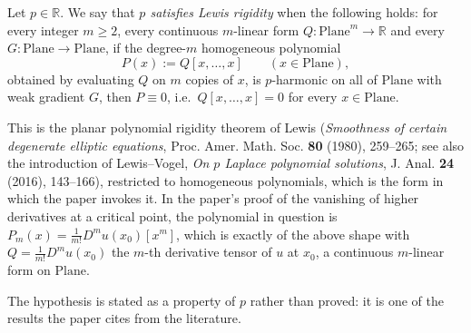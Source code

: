 \begin{definition}
Let $p\in\mathbb{R}$.  We say that \emph{$p$ satisfies Lewis rigidity} when the following
holds: for every integer $m\ge2$, every continuous $m$-linear form
$Q\colon\mathrm{Plane}^m\to\mathbb{R}$ and every $G\colon\mathrm{Plane}\to\mathrm{Plane}$, if
the degree-$m$ homogeneous polynomial
\[
  P(x):=Q[x,\ldots,x]\qquad(x\in\mathrm{Plane}),
\]
obtained by evaluating $Q$ on $m$ copies of $x$, is $p$-harmonic on all of $\mathrm{Plane}$
with weak gradient $G$, then $P\equiv0$, i.e.\ $Q[x,\ldots,x]=0$ for every
$x\in\mathrm{Plane}$.

This is the planar polynomial rigidity theorem of Lewis (\emph{Smoothness of certain
degenerate elliptic equations}, Proc. Amer. Math. Soc. \textbf{80} (1980), 259--265; see also
the introduction of Lewis--Vogel, \emph{On $p$ Laplace polynomial solutions}, J. Anal.
\textbf{24} (2016), 143--166), restricted to homogeneous polynomials, which is the form in
which the paper invokes it.  In the paper's proof of the vanishing of higher derivatives at a
critical point, the polynomial in question is
$P_m(x)=\tfrac1{m!}D^mu(x_0)[x^m]$, which is exactly of the above shape with
$Q=\tfrac1{m!}D^mu(x_0)$ the $m$-th derivative tensor of $u$ at $x_0$, a continuous $m$-linear
form on $\mathrm{Plane}$.

The hypothesis is stated as a property of $p$ rather than proved: it is one of the results
the paper cites from the literature.
\end{definition}
